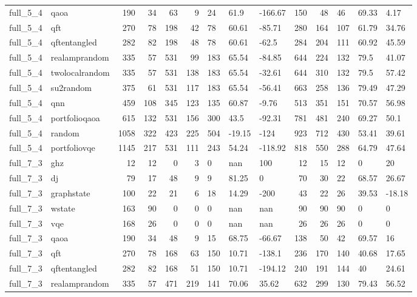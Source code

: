 \begin{longtable}{llrrrrlllrrlll}
full\_5\_4 & qaoa & 190 & 34 & 63 & 9 & 24 & 61.9 & -166.67 & 150 & 48 & 46 & 69.33 & 4.17 \\
full\_5\_4 & qft & 270 & 78 & 198 & 42 & 78 & 60.61 & -85.71 & 280 & 164 & 107 & 61.79 & 34.76 \\
full\_5\_4 & qftentangled & 282 & 82 & 198 & 48 & 78 & 60.61 & -62.5 & 284 & 204 & 111 & 60.92 & 45.59 \\
full\_5\_4 & realamprandom & 335 & 57 & 531 & 99 & 183 & 65.54 & -84.85 & 644 & 224 & 132 & 79.5 & 41.07 \\
full\_5\_4 & twolocalrandom & 335 & 57 & 531 & 138 & 183 & 65.54 & -32.61 & 644 & 310 & 132 & 79.5 & 57.42 \\
full\_5\_4 & su2random & 375 & 61 & 531 & 117 & 183 & 65.54 & -56.41 & 663 & 258 & 136 & 79.49 & 47.29 \\
full\_5\_4 & qnn & 459 & 108 & 345 & 123 & 135 & 60.87 & -9.76 & 513 & 351 & 151 & 70.57 & 56.98 \\
full\_5\_4 & portfolioqaoa & 615 & 132 & 531 & 156 & 300 & 43.5 & -92.31 & 781 & 481 & 240 & 69.27 & 50.1 \\
full\_5\_4 & random & 1058 & 322 & 423 & 225 & 504 & -19.15 & -124 & 923 & 712 & 430 & 53.41 & 39.61 \\
full\_5\_4 & portfoliovqe & 1145 & 217 & 531 & 111 & 243 & 54.24 & -118.92 & 818 & 550 & 288 & 64.79 & 47.64 \\
full\_7\_3 & ghz & 12 & 12 & 0 & 3 & 0 & nan & 100 & 12 & 15 & 12 & 0 & 20 \\
full\_7\_3 & dj & 79 & 17 & 48 & 9 & 9 & 81.25 & 0 & 70 & 30 & 22 & 68.57 & 26.67 \\
full\_7\_3 & graphstate & 100 & 22 & 21 & 6 & 18 & 14.29 & -200 & 43 & 22 & 26 & 39.53 & -18.18 \\
full\_7\_3 & wstate & 163 & 90 & 0 & 0 & 0 & nan & nan & 90 & 90 & 90 & 0 & 0 \\
full\_7\_3 & vqe & 168 & 26 & 0 & 0 & 0 & nan & nan & 26 & 26 & 26 & 0 & 0 \\
full\_7\_3 & qaoa & 190 & 34 & 48 & 9 & 15 & 68.75 & -66.67 & 138 & 50 & 42 & 69.57 & 16 \\
full\_7\_3 & qft & 270 & 78 & 168 & 63 & 150 & 10.71 & -138.1 & 236 & 170 & 140 & 40.68 & 17.65 \\
full\_7\_3 & qftentangled & 282 & 82 & 168 & 51 & 150 & 10.71 & -194.12 & 240 & 191 & 144 & 40 & 24.61 \\
full\_7\_3 & realamprandom & 335 & 57 & 471 & 219 & 141 & 70.06 & 35.62 & 632 & 299 & 130 & 79.43 & 56.52 \\

\end{longtable}
